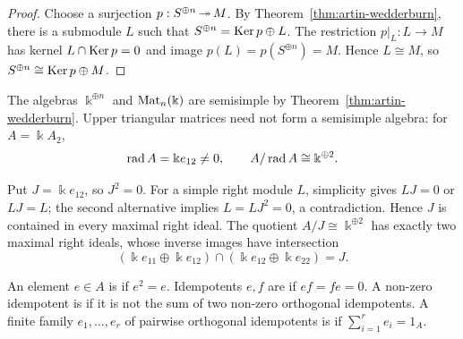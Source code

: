 \begin{proof}
Choose a surjection $p:S^{\oplus n}\operatorname{\twoheadrightarrow} M$.
By Theorem~\ref{thm:artin-wedderburn}, there is a submodule $L$ such that $S^{\oplus n}=\operatorname{Ker}\nolimits p\oplus L$.
The restriction $p|_L:L\to M$ has kernel $L\cap\operatorname{Ker}\nolimits p=0$ and image $p(L)=p(S^{\oplus n})=M$.
Hence $L\cong M$, so $S^{\oplus n}\cong\operatorname{Ker}\nolimits p\oplus M$.
\end{proof}

\begin{example}\label{ex:semisimple-algebras}
The algebras $\Bbbk^{\oplus n}$ and $\operatorname{Mat}\nolimits_n(\Bbbk)$ are semisimple by Theorem~\ref{thm:artin-wedderburn}.
Upper triangular matrices need not form a semisimple algebra: for $A=\Bbbk A_2$,
\[
\operatorname{rad}\nolimits A=\Bbbk e_{12}\neq0,\qquad
A/\operatorname{rad}\nolimits A\cong\Bbbk^{\oplus2}.
\]
\begin{supplementary}
Put $J=\Bbbk e_{12}$, so $J^2=0$.
For a simple right module $L$, simplicity gives $LJ=0$ or $LJ=L$; the second alternative implies $L=LJ^2=0$, a contradiction.
Hence $J$ is contained in every maximal right ideal.
The quotient $A/J\cong\Bbbk^{\oplus2}$ has exactly two maximal right ideals, whose inverse images have intersection
\[
(\Bbbk e_{11}\oplus\Bbbk e_{12})\cap
(\Bbbk e_{12}\oplus\Bbbk e_{22})=J.
\]
\end{supplementary}
\end{example}

\begin{definition}\label{def:idempotents}
An element $e\in A$ is  if $e^2=e$.
Idempotents $e,f$ are  if $ef=fe=0$.
A non-zero idempotent is  if it is not the sum of two non-zero orthogonal idempotents.
A finite family $e_1,\ldots,e_r$ of pairwise orthogonal idempotents is  if $\sum_{i=1}^r e_i=1_A$.
\end{definition}

